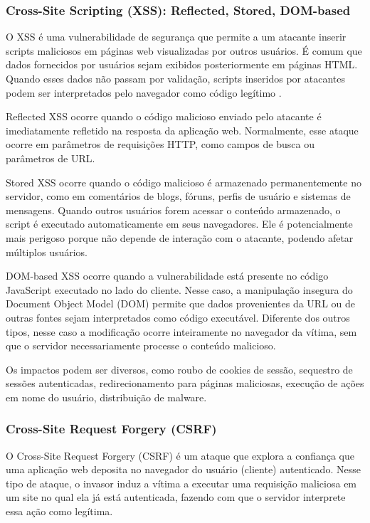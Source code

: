 \subsubsection{
    Cross-Site Scripting (XSS): Reflected, Stored, DOM-based
}
O XSS é uma vulnerabilidade de segurança que permite a um atacante inserir scripts maliciosos em páginas web visualizadas por outros usuários. É comum que dados fornecidos por usuários sejam exibidos posteriormente em páginas HTML. Quando esses dados não passam por validação, scripts inseridos por atacantes podem ser interpretados pelo navegador como código legítimo \cite{sarmah:2018}. 

Reflected XSS ocorre quando o código malicioso enviado pelo atacante é imediatamente refletido na resposta da aplicação web. Normalmente, esse ataque ocorre em parâmetros de requisições HTTP, como campos de busca ou parâmetros de URL. 

Stored XSS ocorre quando o código malicioso é armazenado permanentemente no servidor, como em comentários de blogs, fóruns, perfis de usuário e sistemas de mensagens. Quando outros usuários forem acessar o conteúdo armazenado, o script é executado automaticamente em seus navegadores. Ele é potencialmente mais perigoso porque não depende de interação com o atacante, podendo afetar múltiplos usuários. 

DOM-based XSS ocorre quando a vulnerabilidade está presente no código JavaScript executado no lado do cliente. Nesse caso, a manipulação insegura do Document Object Model (DOM) permite que dados provenientes da URL ou de outras fontes sejam interpretados como código executável. Diferente dos outros tipos, nesse caso a modificação ocorre inteiramente no navegador da vítima, sem que o servidor necessariamente processe o conteúdo malicioso. 

Os impactos podem ser diversos, como roubo de cookies de sessão, sequestro de sessões autenticadas, redirecionamento para páginas maliciosas, execução de ações em nome do usuário, distribuição de malware. 

\subsubsection{
    Cross-Site Request Forgery (CSRF)
}

O Cross-Site Request Forgery (CSRF) é um ataque que explora a confiança que uma aplicação web deposita no navegador do usuário (cliente) autenticado. Nesse tipo de ataque, o invasor induz a vítima a executar uma requisição maliciosa em um site no qual ela já está autenticada, fazendo com que o servidor interprete essa ação como legítima.

